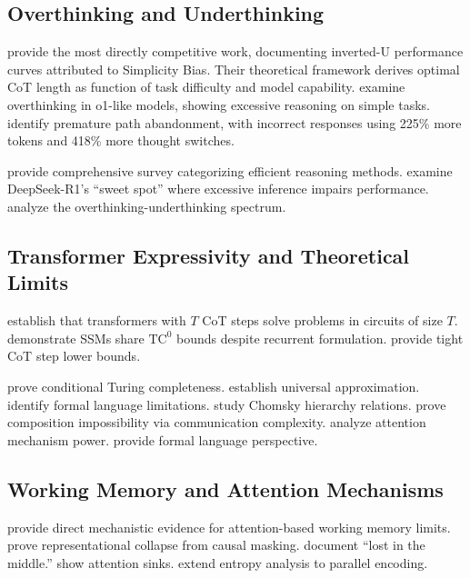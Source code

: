 \documentclass{article}
\theoremstyle{plain}
\theoremstyle{definition}
\theoremstyle{remark}
\begin{document}
\subsection{Overthinking and Underthinking}

\citet{wu2025more} provide the most directly competitive work, documenting inverted-U performance curves attributed to Simplicity Bias. Their theoretical framework derives optimal CoT length as function of task difficulty and model capability. \citet{chen2024overthinking} examine overthinking in o1-like models, showing excessive reasoning on simple tasks. \citet{wang2025underthinking} identify premature path abandonment, with incorrect responses using 225\% more tokens and 418\% more thought switches.

\citet{sui2025stop} provide comprehensive survey categorizing efficient reasoning methods. \citet{marjanovic2025thoughtology} examine DeepSeek-R1's ``sweet spot'' where excessive inference impairs performance. \citet{su2025between} analyze the overthinking-underthinking spectrum.

\subsection{Transformer Expressivity and Theoretical Limits}

\citet{merrill2024expressive} establish that transformers with $T$ CoT steps solve problems in circuits of size $T$. \citet{merrill2024illusion} demonstrate SSMs share $\text{TC}^0$ bounds despite recurrent formulation. \citet{bavandpour2025lower} provide tight CoT step lower bounds.

\citet{perez2021turing} prove conditional Turing completeness. \citet{yun2020universal} establish universal approximation. \citet{hahn2020theoretical} identify formal language limitations. \citet{deletang2023chomsky} study Chomsky hierarchy relations. \citet{peng2024limitations} prove composition impossibility via communication complexity. \citet{bhattamishra2020computational} analyze attention mechanism power. \citet{strobl2024formal} provide formal language perspective.

\subsection{Working Memory and Attention Mechanisms}

\citet{gong2024attention} provide direct mechanistic evidence for attention-based working memory limits. \citet{barbero2024oversquash} prove representational collapse from causal masking. \citet{liu2023lost} document ``lost in the middle.'' \citet{xiao2024efficient} show attention sinks. \citet{zhang2024attention} extend entropy analysis to parallel encoding.
\end{document}
